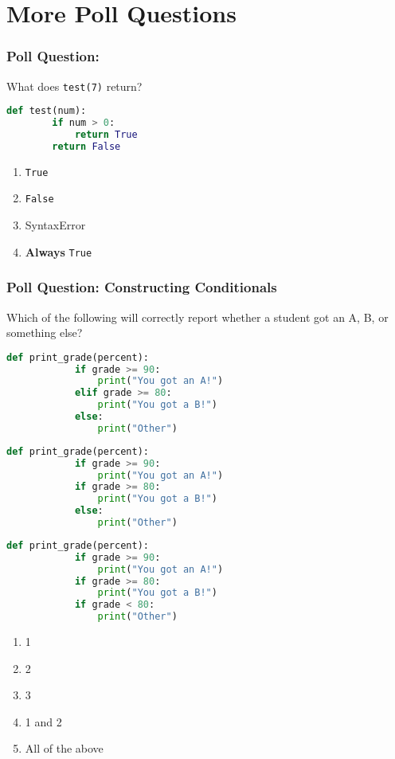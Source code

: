 \documentclass{beamer}
\begin{document}
\section{More Poll Questions}
\begin{frame}[fragile]
	\frametitle{Poll Question: }
	What does \lstinline|test(7)| return?
	\begin{lstlisting}[language=Python, autogobble]
	def test(num):
		if num > 0:
			return True
		return False
	\end{lstlisting}
	\vfill
	\begin{enumerate}[A]
		\item \lstinline|True|
		\item \lstinline|False|
		\item SyntaxError
		\item \textbf{Always} \lstinline|True|
	\end{enumerate}
\end{frame}

%
%
\begin{frame}[fragile]
	\frametitle{Poll Question: Constructing Conditionals}
	Which of the following will correctly report whether a student got an A, B, or something else?\\
	\vfill
	\begin{minipage}{0.32\textwidth}
		\begin{lstlisting}[language=Python, autogobble,basicstyle=\tiny,numbers=none]
		def print_grade(percent):
			if grade >= 90:
				print("You got an A!")
			elif grade >= 80:
				print("You got a B!")
			else:
				print("Other")
		\end{lstlisting}
	\end{minipage}
	\begin{minipage}{0.32\textwidth}
		\begin{lstlisting}[language=Python, autogobble,basicstyle=\tiny,numbers=none]
		def print_grade(percent):
			if grade >= 90:
				print("You got an A!")
			if grade >= 80:
				print("You got a B!")
			else:
				print("Other")
		\end{lstlisting}
	\end{minipage}
	\begin{minipage}{0.32\textwidth}
		\begin{lstlisting}[language=Python, autogobble,basicstyle=\tiny,numbers=none]
		def print_grade(percent):
			if grade >= 90:
				print("You got an A!")
			if grade >= 80:
				print("You got a B!")
			if grade < 80:
				print("Other")
		\end{lstlisting}
	\end{minipage}
	\vfill
	\begin{enumerate}[A]
		\item 1
		\item 2
		\item 3
		\item 1 and 2
		\item All of the above
	\end{enumerate}
\end{frame}
\end{document}

